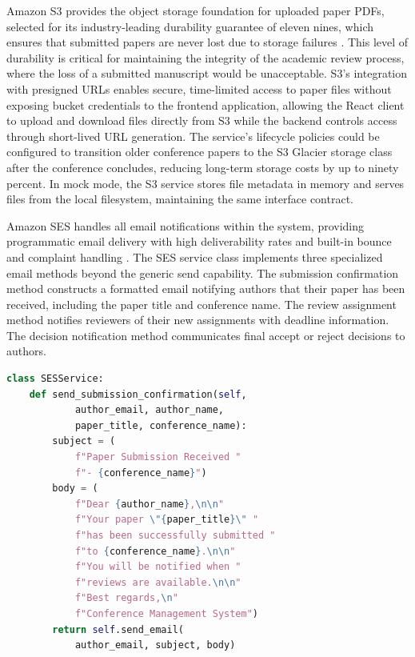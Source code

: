 \documentclass[conference]{IEEEtran}
\begin{document}
Amazon S3 provides the object storage foundation for uploaded paper PDFs, selected for its industry-leading durability guarantee of eleven nines, which ensures that submitted papers are never lost due to storage failures \cite{s3guide}. This level of durability is critical for maintaining the integrity of the academic review process, where the loss of a submitted manuscript would be unacceptable. S3's integration with presigned URLs enables secure, time-limited access to paper files without exposing bucket credentials to the frontend application, allowing the React client to upload and download files directly from S3 while the backend controls access through short-lived URL generation. The service's lifecycle policies could be configured to transition older conference papers to the S3 Glacier storage class after the conference concludes, reducing long-term storage costs by up to ninety percent. In mock mode, the S3 service stores file metadata in memory and serves files from the local filesystem, maintaining the same interface contract.

Amazon SES handles all email notifications within the system, providing programmatic email delivery with high deliverability rates and built-in bounce and complaint handling \cite{ses2024}. The SES service class implements three specialized email methods beyond the generic send capability. The submission confirmation method constructs a formatted email notifying authors that their paper has been received, including the paper title and conference name. The review assignment method notifies reviewers of their new assignments with deadline information. The decision notification method communicates final accept or reject decisions to authors.

\begin{lstlisting}[language=Python, caption={SES service email delivery methods}]
class SESService:
    def send_submission_confirmation(self,
            author_email, author_name,
            paper_title, conference_name):
        subject = (
            f"Paper Submission Received "
            f"- {conference_name}")
        body = (
            f"Dear {author_name},\n\n"
            f"Your paper \"{paper_title}\" "
            f"has been successfully submitted "
            f"to {conference_name}.\n\n"
            f"You will be notified when "
            f"reviews are available.\n\n"
            f"Best regards,\n"
            f"Conference Management System")
        return self.send_email(
            author_email, subject, body)
\end{lstlisting}
\end{document}
